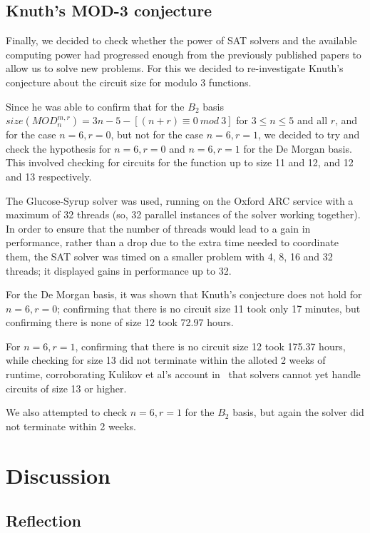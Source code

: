 \documentclass{article}
\begin{document}
\clearpage

\subsection{Knuth's MOD-3 conjecture}\label{knuthresults}

Finally, we decided to check whether the power of SAT solvers and the available computing power had progressed enough from the previously published papers to allow us to solve new problems. For this we decided to re-investigate Knuth's conjecture about the circuit size for modulo 3 functions. 

Since he was able to confirm that for the $B_2$ basis $size(MOD^{m,r}_n) = 3n - 5 - [(n+r) \equiv 0 \ mod \ 3] $ for $3 \leq n \leq 5$ and all $r$, and for the case $n=6, r=0$, but not for the case $n=6, r=1$, we decided to try and check the hypothesis for $n=6, r=0$ and $n=6, r=1$ for the De Morgan basis. This involved checking for circuits for the function up to size 11 and 12, and 12 and 13 respectively. 

The Glucose-Syrup solver was used, running on the Oxford ARC service with a maximum of 32 threads (so, 32 parallel instances of the solver working together). In order to ensure that the number of threads would lead to a gain in performance, rather than a drop due to the extra time needed to coordinate them, the SAT solver was timed on a smaller problem with 4, 8, 16 and 32 threads; it displayed gains in performance up to 32. 

For the De Morgan basis, it was shown that Knuth's conjecture does not hold for $n=6, r=0$; confirming that there is no circuit size 11 took only 17 minutes, but confirming there is none of size 12 took 72.97 hours.

For $n=6, r=1$, confirming that there is no circuit size 12 took 175.37 hours, while checking for size 13 did not terminate within the alloted 2 weeks of runtime, corroborating Kulikov et al's account in~\cite{kulikovlocal} that solvers cannot yet handle circuits of size 13 or higher.

We also attempted to check $n=6, r=1$ for the $B_2$ basis, but again the solver did not terminate within 2 weeks.

\section{Discussion}

\subsection{Reflection}
\end{document}
